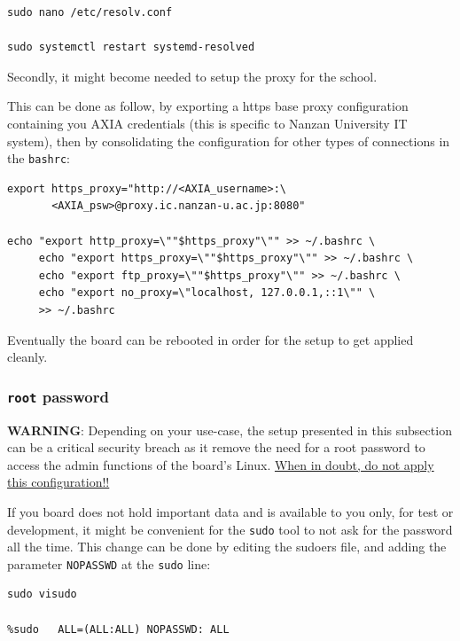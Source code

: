 \documentclass[10pt]{article}
\begin{document}
\begin{verbatim}
sudo nano /etc/resolv.conf

sudo systemctl restart systemd-resolved
\end{verbatim}

Secondly, it might become needed to setup the proxy for the school.

This can be done as follow, by exporting a https base proxy configuration
containing you AXIA credentials (this is specific to Nanzan University IT system),
then by consolidating the configuration for other types of connections in the \texttt{bashrc}:

\begin{verbatim}
export https_proxy="http://<AXIA_username>:\
       <AXIA_psw>@proxy.ic.nanzan-u.ac.jp:8080"

echo "export http_proxy=\""$https_proxy"\"" >> ~/.bashrc \
     echo "export https_proxy=\""$https_proxy"\"" >> ~/.bashrc \
     echo "export ftp_proxy=\""$https_proxy"\"" >> ~/.bashrc \
     echo "export no_proxy=\"localhost, 127.0.0.1,::1\"" \
     >> ~/.bashrc
\end{verbatim}

Eventually the board can be rebooted in order for the setup to get applied cleanly.

\subsubsection{\texttt{root} password}
\label{sec:org8e4db0c}
\begin{tcolorbox}[colback=orange!5!white,colframe=orange!75!black]
\textbf{WARNING}: Depending on your use-case, the setup presented in this
subsection can be a critical security breach as it remove the need for a root
password to access the admin functions of the board's Linux.
\uline{When in doubt, do not apply this configuration!!}
\end{tcolorbox}

If you board does not hold important data
and is available to you only, for test or development,
it might be convenient for the \texttt{sudo} tool to not ask for the
password all the time.
This change can be done by editing the sudoers file, and
adding the parameter \texttt{NOPASSWD}
at the \texttt{sudo} line:

\begin{verbatim}
sudo visudo

%sudo   ALL=(ALL:ALL) NOPASSWD: ALL
\end{verbatim}
\end{document}
